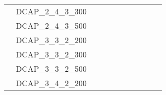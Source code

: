 \begin{table}[]
{\begin{tabular}{|c|l|ll|ll|ll|l|l|l|}
			& DCAP\_2\_4\_3\_300            &                                   &                                  &                           &                          &                           &                          &                                       &                               & \\
			& DCAP\_2\_4\_3\_500            &                                   &                                  &                           &                          &                           &                          &                                       &                               & \\
			& DCAP\_3\_3\_2\_200            &                                   &                                  &                           &                          &                           &                          &                                       &                               & \\
			& DCAP\_3\_3\_2\_300            &                                   &                                  &                           &                          &                           &                          &                                       &                               & \\
			& DCAP\_3\_3\_2\_500            &                                   &                                  &                           &                          &                           &                          &                                       &                               & \\
			& DCAP\_3\_4\_2\_200            &                                   &                                  &                           &                          &                           &                          &                                       &                               & \\

\end{tabular}}
\end{table}
